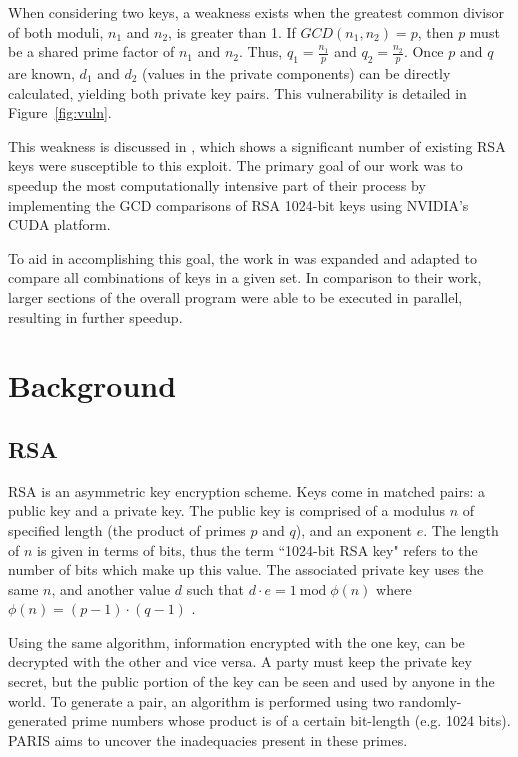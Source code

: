 \documentclass[smallextended]{svjour3}       %
\begin{document}
When considering two keys, a weakness exists when the greatest common 
divisor of both moduli, $n_1$ and $n_2$, is greater than 1. If $GCD(n_1, 
n_2) = p$, then $p$ must be a shared prime factor of $n_1$ and $n_2$. Thus, 
$q_1 = \frac{n_1}{p}$ and $q_2 = \frac{n_2}{p}$. Once $p$ and $q$ are known,
$d_1$ and $d_2$ (values in the private components) can be directly calculated,
yielding both private key pairs. This vulnerability is detailed in
Figure~\ref{fig:vuln}.

This weakness is discussed in \cite{lenstra2012ron}, which shows a significant
number of existing RSA keys were susceptible to this exploit. The primary goal
of our work was to speedup the most computationally intensive part of their
process by implementing the GCD comparisons of RSA 1024-bit keys using NVIDIA's
CUDA platform.

To aid in accomplishing this goal, the work in \cite{fujimoto2009high} was 
expanded and adapted to compare all combinations of keys in a given set. In 
comparison to their work, larger sections of the overall program were able to 
be executed in parallel, resulting in further speedup.


\section{Background}
\label{sec:background}

\subsection{RSA}
\label{subsec:rsa}
RSA is an asymmetric key encryption scheme. Keys come in matched pairs: a
public key and a private key. The public key is comprised of a modulus $n$ of
specified length (the product of primes $p$ and $q$), and an exponent $e$. The
length of $n$ is given in terms of bits, thus the term ``1024-bit RSA key"
refers to the number of bits which make up this value. The associated private
key uses the same $n$, and another value $d$ such that $d \cdot e = 1
\:\text{mod} \;\phi(n)$ where $\phi(n) = (p - 1) \cdot (q - 1)$
\citep{rivest1978method}.

Using the same algorithm, information encrypted with the one key, can be
decrypted with the other and vice versa. A party must keep the private key
secret, but the public portion of the key can be seen and used by anyone in the
world. To generate a pair, an algorithm is performed using two
randomly-generated prime numbers whose product is of a certain bit-length (e.g.
1024 bits). PARIS aims to uncover the inadequacies present in these primes.
\end{document}
